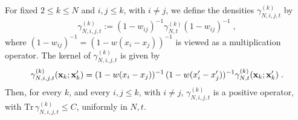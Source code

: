 \documentclass[11pt]{article}
\newcommand{\bx}{{\bf x}}
\newcommand{\tr}{\mbox{Tr}}
\begin{document}
For fixed  $2\leq k \leq N$ and $i,j \leq k$, with $i \neq j$, we
define the densities $\gamma^{(k)}_{N,i,j,t}$ by
\begin{equation}\label{eq:gammaij}
\gamma^{(k)}_{N,i,j,t} := (1-w_{ij})^{-1} \gamma^{(k)}_{N,t}
(1-w_{ij})^{-1}\; ,
\end{equation}
where $(1-w_{ij})^{-1} = (1-w (x_i -x_j))^{-1}$ is viewed as a
multiplication operator. The kernel of $\gamma^{(k)}_{N,i,j,t}$ is
given by
\begin{equation}\label{eq:gammaij-ker}
\gamma^{(k)}_{N,i,j,t} (\bx_k ;\bx'_k) = (1-w(x_i-x_j))^{-1} \,
(1-w(x'_i-x'_j))^{-1} \gamma^{(k)}_{N,t} (\bx_k;\bx'_k)\; .
\end{equation}
Then, for every $k$, and every $i,j \leq k$, with $i\neq j$,
$\gamma_{N,i,j,t}^{(k)}$ is a positive operator, with $\tr \,
\gamma^{(k)}_{N,i,j,t} \leq C$, uniformly in $N,t$.
\end{document}
